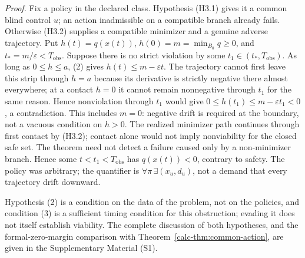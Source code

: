 \documentclass[10pt,twocolumn]{article}
\theoremstyle{definition}
\begin{document}
\emph{Proof.} Fix a policy in the declared class. Hypothesis (H3.1)
gives it a common blind control \(u\); an action inadmissible on a
compatible branch already fails. Otherwise (H3.2) supplies a compatible
minimizer and a genuine adverse trajectory. Put
\(h(t)=q(x(t))\), \(h(0)=m=\min_{B_0}q\ge0\), and
\(t_*=m/\varepsilon<T_{\mathrm{obs}}\). Suppose there is no strict
violation by some \(t_1\in(t_*,T_{\mathrm{obs}})\). As long as
\(0\le h\le a\), (2) gives \(h(t)\le m-\varepsilon t\).
The trajectory cannot first leave this strip through \(h=a\) because
its derivative is strictly negative there almost everywhere; at a
contact \(h=0\) it cannot remain nonnegative through \(t_1\)
for the same reason. Hence nonviolation through \(t_1\) would give
\(0\le h(t_1)\le m-\varepsilon t_1<0\), a contradiction.
This includes \(m=0\): negative drift is required at the boundary,
not a vacuous condition on \(h>0\). The realized minimizer path continues through first contact by (H3.2); contact alone would not imply nonviability for the closed safe set. The theorem need not detect a failure caused only by a non-minimizer branch. Hence some \(t<t_1<T_{\mathrm{obs}}\) has
\(q(x(t))<0\), contrary to safety. The policy was arbitrary; the
quantifier is \(\forall\pi\,\exists(x_u,d_u)\), not a demand that
every trajectory drift downward.

Hypothesis (2) is a condition on the data of the problem, not on the policies, and condition (3) is a sufficient timing condition for this obstruction; evading it does not itself establish viability. The complete discussion of both hypotheses, and the formal-zero-margin comparison with Theorem~\ref{calc-thm:common-action}, are given in the Supplementary Material (S1).
\end{document}
